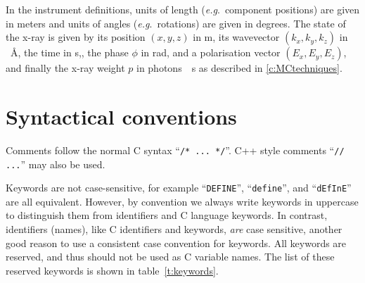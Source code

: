 In the instrument definitions, units of length (\textit{e.g}.\ component
positions) are given in meters and units of angles (\textit{e.g}.\
rotations) are given in degrees.  The state of the x-ray is given by
its position $(x,y,z)$ in \si{m}, its wavevector $(k_x, k_y, k_z)$ in
\si{\per\angstrom}, the time in \si{s},, the phase $\phi$ in \si{\radian}, and a polarisation vector
$\left( E_x, E_y, E_z \right)$, and finally the x-ray weight $p$ in photons~\si{\per s} as described in \cref{c:MCtechniques}.

\section{Syntactical conventions}
\label{s:syntax}

Comments follow the normal C syntax ``\verb+/* ... */+''. C++ style
comments ``\verb+// ...+'' may also be used.


Keywords are not case-sensitive, for example ``\verb+DEFINE+'',
``\verb+define+'', and ``\verb+dEfInE+'' are all equivalent. However, by
convention we always write keywords in uppercase to distinguish them
from identifiers and C language keywords. In contrast, \MCX
identifiers (names), like C identifiers and keywords, \emph{are} case
sensitive, another good reason to use a consistent case convention for
keywords. All \MCX keywords are reserved, and thus should not be used
as C variable names. The list of these reserved keywords is shown in table~\ref{t:keywords}. 

